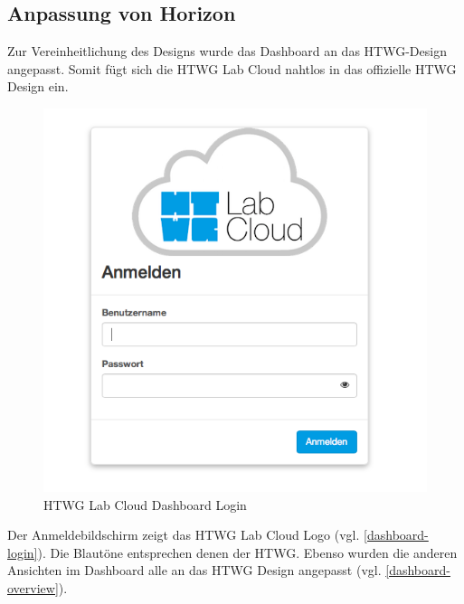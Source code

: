\subsection{Anpassung von Horizon}

Zur Vereinheitlichung des Designs wurde das Dashboard an das HTWG-Design angepasst. Somit fügt sich die HTWG Lab Cloud nahtlos in das offizielle HTWG Design ein.

\begin{figure}[htbp]
\centering
\includegraphics[scale=0.4]{img/dashboard-login.png}
\caption{HTWG Lab Cloud Dashboard Login}
\label{dashboard-login}
\end{figure}

Der Anmeldebildschirm zeigt das HTWG Lab Cloud Logo (vgl. \autoref{dashboard-login}).
Die Blautöne entsprechen denen der HTWG.
Ebenso wurden die anderen Ansichten im Dashboard alle an das HTWG Design angepasst (vgl. \autoref{dashboard-overview}).

